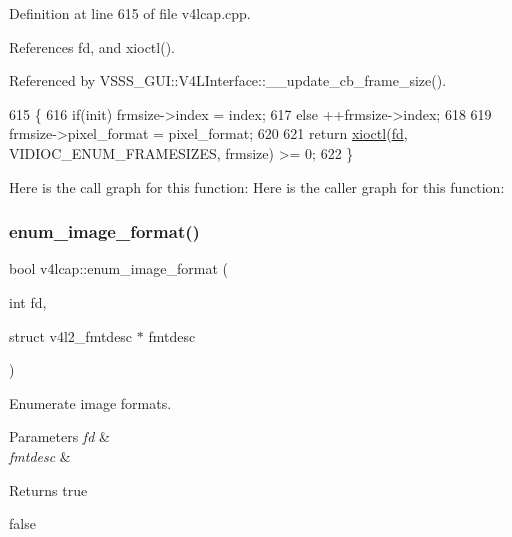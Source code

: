 Definition at line 615 of file v4lcap.\+cpp.



References fd, and xioctl().



Referenced by V\+S\+S\+S\+\_\+\+G\+U\+I\+::\+V4\+L\+Interface\+::\+\_\+\+\_\+update\+\_\+cb\+\_\+frame\+\_\+size().


\begin{DoxyCode}
615                                                                                                       \{
616     \textcolor{keywordflow}{if}(init) frmsize->index = index;
617     \textcolor{keywordflow}{else} ++frmsize->index;
618 
619     frmsize->pixel\_format = pixel\_format;
620 
621     \textcolor{keywordflow}{return} \hyperlink{classv4lcap_ab5aaa5a8c0df17f5ca57e0b5170232cb}{xioctl}(\hyperlink{classv4lcap_a38109593bde997dad13b3a461569573d}{fd}, VIDIOC\_ENUM\_FRAMESIZES, frmsize) >= 0;
622 \}
\end{DoxyCode}
Here is the call graph for this function\+:
Here is the caller graph for this function\+:
\mbox{\label{classv4lcap_a4f5a8ccdd2a75e9d2f2d4d541fdb84dd}} 
\subsubsection{\texorpdfstring{enum\+\_\+image\+\_\+format()}{enum\_image\_format()}\hspace{0.1cm}{\footnotesize\ttfamily [1/2]}}
{\footnotesize\ttfamily bool v4lcap\+::enum\+\_\+image\+\_\+format (\begin{DoxyParamCaption}\item[{int}]{fd,  }\item[{struct v4l2\+\_\+fmtdesc $\ast$}]{fmtdesc }\end{DoxyParamCaption})}



Enumerate image formats. 


\begin{DoxyParams}{Parameters}
{\em fd} & \\
\hline
{\em fmtdesc} & \\
\hline
\end{DoxyParams}
\begin{DoxyReturn}{Returns}
true 

false 
\end{DoxyReturn}


